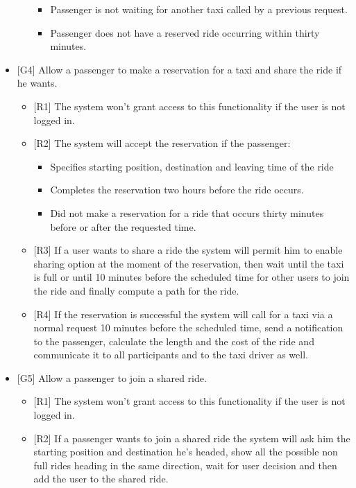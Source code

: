\begin{itemize}
\begin{itemize}
\begin{itemize}
			\item Passenger is not waiting for another taxi called by a previous request.
			\item Passenger does not have a reserved ride occurring within thirty minutes.
		\end{itemize}
	\end{itemize}
		\item {[G4]} Allow a passenger to make a reservation for a taxi and share the ride if he wants.
			\begin{itemize}
				\item {[R1]} The system won't grant access to this functionality if the user is not logged in.
				\item {[R2]} The system will accept the reservation if the passenger: 
				\begin{itemize}
					\item Specifies starting position, destination and leaving time of the ride
					\item Completes the reservation two hours before the ride occurs.
					\item Did not make a reservation for a ride that occurs thirty minutes before or after the requested time.					
				\end{itemize}
				\item {[R3]} If a user wants to share a ride the system will permit him to enable sharing option at the moment of the reservation, then wait until the taxi is full or until 10 minutes before the scheduled time for other users to join the ride and finally compute a path for the ride.
				\item {[R4]} If the reservation is successful the system will call for a taxi via a normal request 10 minutes before the scheduled time, send a notification to the passenger, calculate the length and the cost of the ride and communicate it to all participants and to the taxi driver as well.
			\end{itemize}
		\item {[G5]} Allow a passenger to join a shared ride.
			\begin{itemize}
				\item {[R1]} The system won't grant access to this functionality if the user is not logged in.
				\item {[R2]} If a passenger wants to join a shared ride the system will ask him the starting position and destination he's headed, show all the possible non full rides heading in the same direction, wait for user decision and then add the user to the shared ride.

\end{itemize}
\end{itemize}
